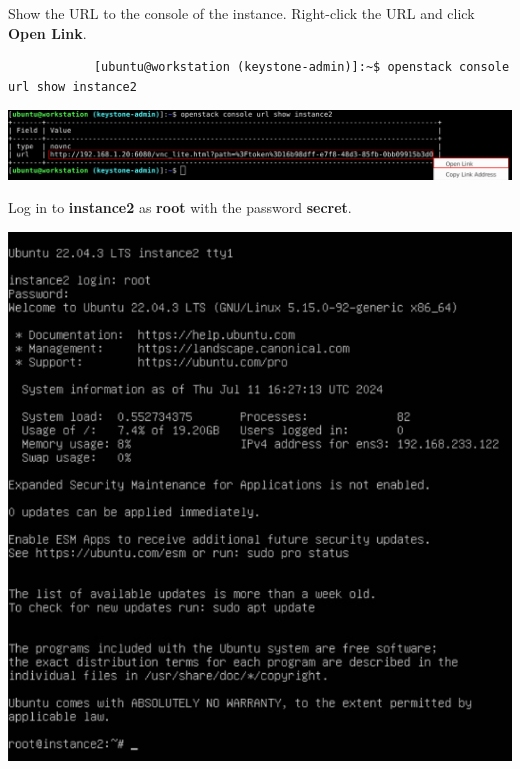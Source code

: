 \documentclass[letterpaper, 12pt]{article}
\begin{document}
\begin{enumerate}
    \begin{labstep}
        Show the URL to the console of the instance.
        Right-click the URL and click \textbf{Open Link}.
        \begin{lstlisting}
            [ubuntu@workstation (keystone-admin)]:~$ openstack console url show instance2
        \end{lstlisting}

        \begin{center}
            \includegraphics[width=\linewidth]{images/part2/step5.png}
        \end{center}
    \end{labstep}

    \begin{labstep}
        Log in to \textbf{instance2} as \textbf{root} with the password \textbf{secret}.

        \begin{center}
            \includegraphics[width=\linewidth]{images/part2/step6.png}
        \end{center}
    \end{labstep}


\end{enumerate}
\end{document}
